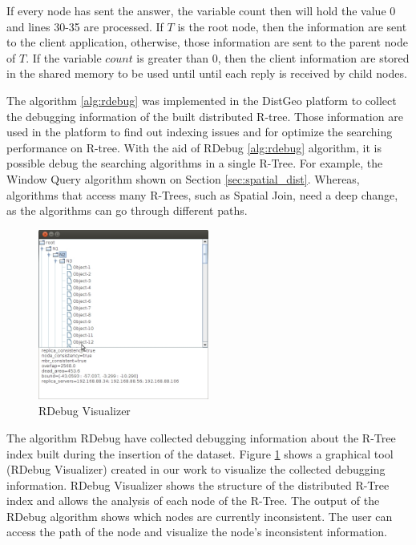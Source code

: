 If every node has sent the answer, the variable count then will hold the value 0 and lines 30-35 are processed. 
If $T$ is the root node, then the information are sent to the client application, otherwise, those information are sent to the parent node of $T$. 
If the variable $count$ is greater than 0, then the client information are stored in the shared memory to be used until until each reply is received by child nodes.
	
The algorithm \ref{alg:rdebug} was implemented in the DistGeo platform to collect the debugging information of the built distributed R-tree. 
Those information are used in the platform to find out indexing issues and for optimize the searching performance on R-tree.
With the aid of RDebug \ref{alg:rdebug} algorithm, it is possible debug the searching algorithms in a single R-Tree. 
For example, the Window Query algorithm shown on Section \ref{sec:spatial_dist}. 
Whereas, algorithms that access many R-Trees, such as Spatial Join, need a deep change, as the algorithms can go through different paths.

\begin{figure}[ht]
  \centering
  \includegraphics[width=0.5\textwidth]{rdebug-vis.jpg}
  \caption{RDebug Visualizer}
  \label{fig:rdebug-vis}
\end{figure}

The algorithm RDebug have collected debugging information about the R-Tree index built during the insertion of the dataset.
Figure \ref{fig:rdebug-vis} shows a graphical tool (RDebug Visualizer) created in our work to visualize the collected debugging information.
RDebug Visualizer shows the structure of the distributed R-Tree index and allows the analysis of each node of the R-Tree.
The output of the RDebug algorithm shows which nodes are currently inconsistent.
The user can access the path of the node and visualize the node's inconsistent information.    